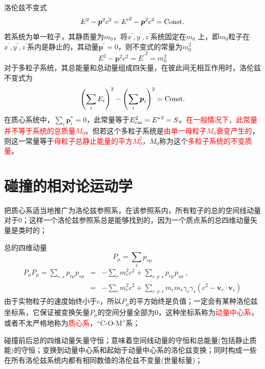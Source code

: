 \documentclass[11pt,a4paper]{article}
\renewcommand{\vec}[1]{\boldsymbol{#1}}
\begin{document}
洛伦兹不变式
\begin{equation}
E^2 -\vec{p}^2 c^2 = {E^{\prime}}^2 -\vec{p}^2 c^2 = {\rm Const.}
\end{equation}
若系统为单一粒子，其静质量为$m_0$，将$x^{\prime}, y^{\prime}, z^{\prime}$系统固定在$m_0$ 上，即$m_0$粒子在$x^{\prime}, y^{\prime}, z^{\prime}$系内是静止的，其动量$\vec{p}^{\prime} = 0$，则不变式的常量为$m_0^2$
\begin{equation}
E^2 -\vec{p}^2 c^2 = {E^{\prime}}^2 = m_0^2
\end{equation}
对于多粒子系统，其总能量和总动量组成四矢量，在彼此间无相互作用时，洛伦兹不变式为
\begin{eqnarray}
\left(\sum_i E_i  \right)^2 -\left(\sum_i \vec{p}_i  \right)^2 = {\rm Const.}
\end{eqnarray}
在质心系统中，$\sum_i \vec{p}_i^* = 0$，此常量等于$E_{\rm cm}^2 = {E^*}^2 = S$。\textcolor{red}{在一般情况下，此常量并不等于系统的总质量$M_0$}。但若这个多粒子系统是\textcolor{red}{由单一母粒子$M_0$衰变产生的}，则这一常量等于\textcolor{red}{母粒子总静止能量的平方$M_0^2$}，$M_0$称为这个\textcolor{red}{多粒子系统的不变质量}。




\section{碰撞的相对论运动学}
把质心系适当地推广为洛伦兹参照系，在该参照系内，所有粒子的总的空间线动量对于$0$；这样一个洛伦兹参照系总是能够找到的，因为一个质点系的总四维动量矢量是类时的；

总的四维动量
\begin{equation}
P_{\mu} = \sum_r p_{r\mu}
\end{equation}
\begin{eqnarray}
\nonumber P_{\mu} P_{\mu} = \sum_{r,s} p_{r\mu} p_{s\mu} &=& -\sum_{r} m_r^2 c^2 + \sum_{r \neq s} p_{r\mu} p_{s\mu} ~, \\
&=& -\sum_{r} m_r^2 c^2 + \sum_{r \neq s} m_r m_s \gamma_r \gamma_s (c^2 -\vec{v}_r \cdot \vec{v}_s)
\end{eqnarray}
由于实物粒子的速度始终小于$c$，所以$P_{\mu}$的平方始终是负值；一定会有某种洛伦兹坐标系，它保证被变换矢量$P_{\mu}$的空间分量全部为$0$，这种坐标系称为\textcolor{red}{动量中心系}，或者不太严格地称为\textcolor{red}{质心系}，“C-O-M”系；

碰撞前后总的四维动量矢量守恒；意味着空间线动量的守恒和总能量(包括静止质能)的守恒；变换到动量中心系和起始于动量中心系的洛伦兹变换；同时构成一些在所有洛伦兹系统内都有相同数值的洛伦兹不变量(世量标量)；
\end{document}
